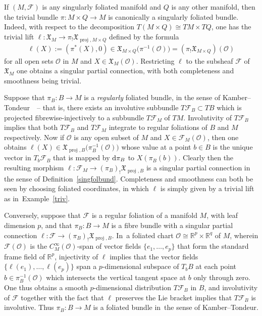 \documentclass[10pt,a4paper]{amsart}
\numberwithin{equation}{section}
\def\proj{\operatorname{proj}}
\def\FF{{\mathcal{F}}}
\def\OO{{\mathcal{O}}}
\def\RB{{\mathbb{R}}}
\def\XF{{\mathfrak{X}}}
\begin{document}
\begin{Example}\label{triv}
If $(M,\FF)$ is any singularly foliated manifold and $Q$ is any other manifold, then the trivial bundle $\pi\colon M\times Q\rightarrow M$ is canonically a singularly foliated bundle. Indeed, with respect to the decomposition $T(M\times Q)\cong TM\times TQ$, one has the trivial lift $\ell\colon \XF_{M}\rightarrow\pi_{!}\XF_{\proj,M\times Q}$ defined by the formula
\begin{gather*}
\ell(X):=(\pi^{*}(X),0)\in\XF_{M\times Q}\big(\pi^{-1}(\OO)\big) = (\pi_{!}\XF_{M\times Q})(\OO)
\end{gather*}
for all open sets $\OO$ in $M$ and $X\in\XF_{M}(\OO)$. Restricting $\ell$ to the subsheaf $\FF$ of $\XF_{M}$ one obtains a singular partial connection, with both completeness and smoothness being trivial.
\end{Example}

\begin{Example}\label{regex}
Suppose that $\pi_{B}\colon B\rightarrow M$ is a \textit{regularly} foliated bundle, in the sense of Kamber--Tondeur~\cite[Definition~2.1]{folbund}~-- that is, there exists an involutive subbundle $T\FF_{B}\subset TB$ which is projected fibrewise-injectively to a subbundle $T\FF_{M}$ of $TM$. Involutivity of $T\FF_{B}$ implies that both $T\FF_{B}$ and $T\FF_{M}$ integrate to regular foliations of $B$ and $M$ respectively. Now if $\OO$ is any open subset of $M$ and $X\in\FF_{M}(\OO)$, then one obtains $\ell(X)\in\XF_{\proj,B}\big(\pi_{B}^{-1}(\OO)\big)$ whose value at a point $b\in B$ is the unique vector in $T_{b}\FF_{B}$ that is mapped by ${\rm d}\pi_{B}$ to $X(\pi_{B}(b))$. Clearly then the resulting morphism $\ell\colon \FF_{M}\rightarrow(\pi_{B})_{!}\XF_{\proj,B}$ is a singular partial connection in the sense of Definition~\ref{singfolbund}. Completeness and smoothness can both be seen by choosing foliated coordinates, in which $\ell$ is simply given by a trivial lift as in~Example~\ref{triv}.

Conversely, suppose that $\FF$ is a regular foliation of a manifold $M$, with leaf dimension $p$, and that $\pi_{B}\colon B\rightarrow M$ is a fibre bundle with a singular partial connection $\ell\colon \FF\rightarrow(\pi_{B})_{!}\XF_{\proj,B}$. In~a foliated chart $\OO\cong\RB^{p}\times\RB^{q}$ of $M$, wherein $\FF(\OO)$ is the $C^{\infty}_{M}(\OO)$-span of vector fields $\{e_{1},\dots,e_{p}\}$ that form the standard frame field of $\RB^{p}$, injectivity of $\ell$ implies that the vector fields $\{\ell(e_{1}),\dots,\ell(e_{p})\}$ span a $p$-dimensional subspace of $T_{b}B$ at each point $b\in\pi_{B}^{-1}(\OO)$ which intersects the vertical tangent space at $b$ only through zero. One thus obtains a smooth $p$-dimensional distribution $T\FF_{B}$ in $B$, and involutivity of $\FF$ together with the fact that $\ell$ preserves the Lie bracket implies that $T\FF_{B}$ is involutive. Thus $\pi_{B}\colon B\rightarrow M$ is a foliated bundle in~the sense of Kamber--Tondeur.
\end{Example}
\end{document}
